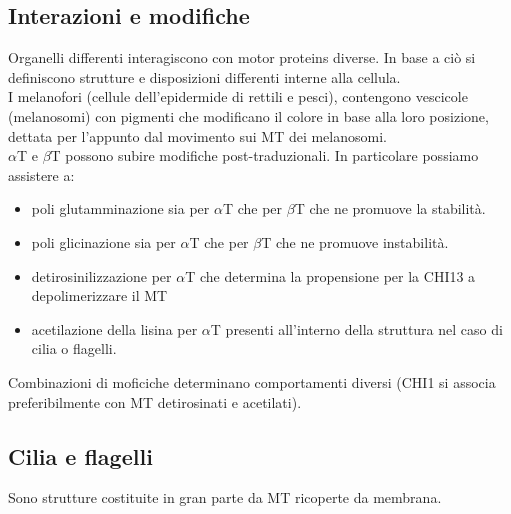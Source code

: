         \subsection{Interazioni e modifiche}
            Organelli differenti interagiscono con motor proteins diverse. In base a ciò si definiscono strutture e disposizioni differenti interne alla cellula.\\
            I melanofori (cellule dell'epidermide di rettili e pesci), contengono vescicole (melanosomi) con pigmenti che modificano il colore in base alla loro posizione, dettata per l'appunto dal movimento sui MT dei melanosomi.\\
            
            $\alpha$T e $\beta$T possono subire modifiche post-traduzionali. In particolare possiamo assistere a:
            \begin{itemize}
                \item poli glutamminazione sia per $\alpha$T che per $\beta$T che ne promuove la stabilità.
                \item poli glicinazione sia per $\alpha$T che per $\beta$T che ne promuove instabilità.
                \item detirosinilizzazione per $\alpha$T che determina la propensione per la CHI13 a depolimerizzare il MT
                \item acetilazione della lisina per $\alpha$T presenti all'interno della struttura nel caso di cilia o flagelli.
            \end{itemize}
            Combinazioni di moficiche determinano comportamenti diversi (CHI1 si associa preferibilmente con MT detirosinati e acetilati).
        
    \subsection{Cilia e flagelli}
        Sono strutture costituite in gran parte da MT ricoperte da membrana. 
